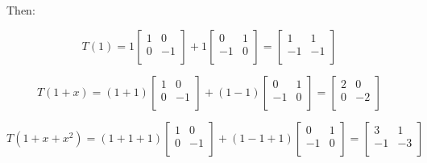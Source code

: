 \documentclass[12pt]{article}
\begin{document}
Then:

$$
T(1)=
1
\begin{bmatrix}
	1 & 0 \\
	0 & -1 \\
\end{bmatrix}
+1
\begin{bmatrix}
	0 & 1 \\
	-1 & 0 \\
\end{bmatrix}
=
\begin{bmatrix}
	1 & 1 \\
	-1 & -1 \\
\end{bmatrix}
$$

$$
T(1+x)=
(1+1)
\begin{bmatrix}
	1 & 0 \\
	0 & -1 \\
\end{bmatrix}
+(1-1)
\begin{bmatrix}
	0 & 1 \\
	-1 & 0 \\
\end{bmatrix}
=
\begin{bmatrix}
	2 & 0 \\
	0 & -2 \\
\end{bmatrix}
$$

$$
T(1+x+x^2)=
(1+1+1)
\begin{bmatrix}
	1 & 0 \\
	0 & -1 \\
\end{bmatrix}
+(1-1+1)
\begin{bmatrix}
	0 & 1 \\
	-1 & 0 \\
\end{bmatrix}
=
\begin{bmatrix}
	3 & 1 \\
	-1 & -3 \\
\end{bmatrix}
$$
\end{document}
